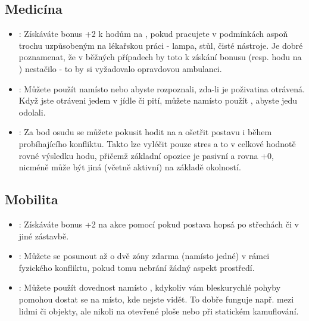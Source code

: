 \subsection{Medicína}
\label{sec:trik-medicina}
\begin{itemize}
  
\item{}:
  \label{sec:medicina-ambulance}
Získáváte bonus +2 k hodům na , pokud pracujete v podmínkách aspoň trochu uzpůsobeným na lékařskou práci - lampa, stůl, čisté nástroje. Je dobré poznamenat, že v běžných případech by toto k získání bonusu (resp. hodu na ) nestačilo - to by si vyžadovalo opravdovou ambulanci.

\item{}:
  \label{sec:medicina-vyziva}
Můžete použít  namísto  nebo  abyste rozpoznali, zda-li je poživatina otrávená. Když jste otráveni jedem v jídle či pití, můžete namísto  použít , abyste jedu odolali.

\item{}:
  \label{sec:medicina-boj}
  Za bod osudu se můžete pokusit hodit na  a ošetřit postavu i během probíhajícího konfliktu. Takto lze vyléčit pouze stres a to v celkové hodnotě rovné výsledku hodu, přičemž základní opozice je pasivní a rovna +0, nicméně může být jiná (včetně aktivní) na základě okolností.
\end{itemize}

\subsection{Mobilita}
\label{sec:trik-mobilita}
\begin{itemize}
  
\item{}:
\label{sec:mobilita-parkour}
Získáváte bonus +2 na akce  pomocí  pokud postava hopsá po střechách či v jiné zástavbě.

\item{}:
\label{sec:mobilita-sprinter}
Můžete se posunout až o dvě zóny zdarma (namísto jedné) v rámci fyzického konfliktu, pokud tomu nebrání žádný aspekt prostředí.


\item{}:
\label{sec:mobilita-zmizeni}
Můžete použít dovednost  namísto , kdykoliv vám bleskurychlé pohyby pomohou dostat se na místo, kde nejste vidět. To dobře funguje např. mezi lidmi či objekty, ale nikoli na otevřené ploše nebo při statickém kamuflování.
\end{itemize}

